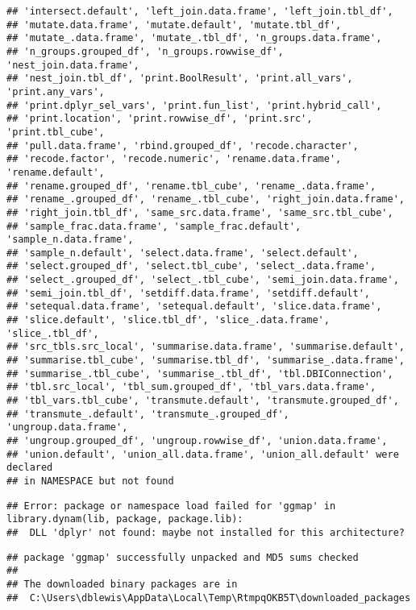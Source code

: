 \documentclass[]{article}
\begin{document}
\begin{verbatim}
## 'intersect.default', 'left_join.data.frame', 'left_join.tbl_df',
## 'mutate.data.frame', 'mutate.default', 'mutate.tbl_df',
## 'mutate_.data.frame', 'mutate_.tbl_df', 'n_groups.data.frame',
## 'n_groups.grouped_df', 'n_groups.rowwise_df', 'nest_join.data.frame',
## 'nest_join.tbl_df', 'print.BoolResult', 'print.all_vars', 'print.any_vars',
## 'print.dplyr_sel_vars', 'print.fun_list', 'print.hybrid_call',
## 'print.location', 'print.rowwise_df', 'print.src', 'print.tbl_cube',
## 'pull.data.frame', 'rbind.grouped_df', 'recode.character',
## 'recode.factor', 'recode.numeric', 'rename.data.frame', 'rename.default',
## 'rename.grouped_df', 'rename.tbl_cube', 'rename_.data.frame',
## 'rename_.grouped_df', 'rename_.tbl_cube', 'right_join.data.frame',
## 'right_join.tbl_df', 'same_src.data.frame', 'same_src.tbl_cube',
## 'sample_frac.data.frame', 'sample_frac.default', 'sample_n.data.frame',
## 'sample_n.default', 'select.data.frame', 'select.default',
## 'select.grouped_df', 'select.tbl_cube', 'select_.data.frame',
## 'select_.grouped_df', 'select_.tbl_cube', 'semi_join.data.frame',
## 'semi_join.tbl_df', 'setdiff.data.frame', 'setdiff.default',
## 'setequal.data.frame', 'setequal.default', 'slice.data.frame',
## 'slice.default', 'slice.tbl_df', 'slice_.data.frame', 'slice_.tbl_df',
## 'src_tbls.src_local', 'summarise.data.frame', 'summarise.default',
## 'summarise.tbl_cube', 'summarise.tbl_df', 'summarise_.data.frame',
## 'summarise_.tbl_cube', 'summarise_.tbl_df', 'tbl.DBIConnection',
## 'tbl.src_local', 'tbl_sum.grouped_df', 'tbl_vars.data.frame',
## 'tbl_vars.tbl_cube', 'transmute.default', 'transmute.grouped_df',
## 'transmute_.default', 'transmute_.grouped_df', 'ungroup.data.frame',
## 'ungroup.grouped_df', 'ungroup.rowwise_df', 'union.data.frame',
## 'union.default', 'union_all.data.frame', 'union_all.default' were declared
## in NAMESPACE but not found
\end{verbatim}

\begin{verbatim}
## Error: package or namespace load failed for 'ggmap' in library.dynam(lib, package, package.lib):
##  DLL 'dplyr' not found: maybe not installed for this architecture?
\end{verbatim}

\begin{verbatim}
## package 'ggmap' successfully unpacked and MD5 sums checked
## 
## The downloaded binary packages are in
##  C:\Users\dblewis\AppData\Local\Temp\RtmpqOKB5T\downloaded_packages
\end{verbatim}
\end{document}
